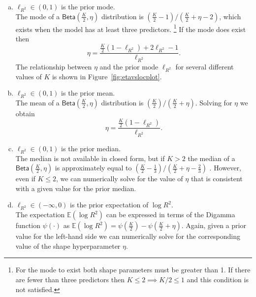 \documentclass[11pt]{article}
\newcommand{\locRsq}{\ell_{R^2}}
\newcommand{\halfK}{\frac{K}{2}}
\newcommand{\Betadist}[2]{\mathsf{Beta}\left(#1,#2\right)}
\newcommand{\Digamma}[1]{\psi\left(#1\right)}
\begin{document}
\begin{enumerate}[(a)]
\item $\locRsq \in \left(0,1\right)$ is the prior mode. \\[5pt]
%
The mode of a $\Betadist{\halfK}{\eta}$ distribution is
$\left(\halfK - 1\right) / \left(\halfK + \eta - 2\right)$, which exists when
the model has at least three predictors.%
\footnote{For the mode to exist both shape parameters must be greater than 1. If
there are fewer than three predictors then $K \leq 2 \implies K/2 \leq 1$ and
this condition is not satisfied.}
If the mode does exist then
%
$$\eta = \frac{\halfK \left(1 - \locRsq\right) + 2\locRsq - 1}{\locRsq}.$$
%
The relationship between $\eta$ and the prior mode $\locRsq$ for
several different values of $K$ is shown in Figure~\ref{fig:etavslocplot}.

\item $\locRsq \in \left(0,1\right)$ is the prior mean. \\[5pt]
%
The mean of a $\Betadist{\halfK}{\eta}$ distribution is
$\left(\halfK\right) / \left(\halfK + \eta\right)$. Solving for $\eta$ we obtain
%
$$\eta = \frac{\halfK \left(1 - \locRsq \right)}{\locRsq}.$$

\item $\locRsq \in \left(0,1\right)$ is the prior median. \\[5pt]
%
The median is not available in closed form, but if $K > 2$ the median of a
$\Betadist{\halfK}{\eta}$ is approximately equal to
$\left(\halfK - \frac{1}{3}\right) / \left(\halfK + \eta - \frac{2}{3}\right)$
\cite{kerman}. However, even if $K \leq 2$, we can numerically solve for the
value of $\eta$ that is consistent with a given value for the prior median.

\item $\locRsq \in \left(-\infty,0\right)$ is the prior expectation of
$\log{R^2}$. \\[5pt]
%
The expectation $\mathbb{E}\left(\log{R^2}\right)$ can be expressed in terms of
the Digamma function $\Digamma{\cdot}$ as
$\mathbb{E}\left(\log{R^2}\right) = \Digamma{\halfK} - \Digamma{\halfK + \eta}$.
Again, given a prior value for the left-hand side we can numerically solve for
the corresponding value of the shape hyperparameter $\eta$.
\end{enumerate}
\end{document}
